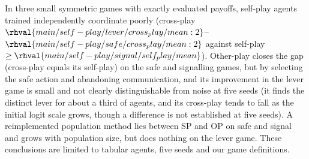In three small symmetric games with exactly evaluated payoffs, self-play agents trained independently coordinate poorly (cross-play $\rhval{main/self-play/lever/cross_play/mean:2}$--$\rhval{main/self-play/safe/cross_play/mean:2}$ against self-play $\ge\rhval{main/self-play/signal/self_play/mean}$). Other-play closes the gap (cross-play equals its self-play) on the safe and signalling games, but by selecting the safe action and abandoning communication, and its improvement in the lever game is small and not clearly distinguishable from noise at five seeds (it finds the distinct lever for about a third of agents, and its cross-play tends to fall as the initial logit scale grows, though a difference is not established at five seeds). A reimplemented population method lies between SP and OP on safe and signal and grows with population size, but does nothing on the lever game. These conclusions are limited to tabular agents, five seeds and our game definitions.

